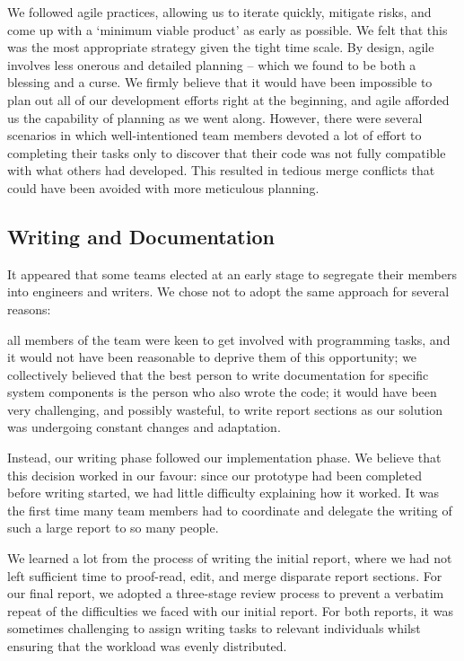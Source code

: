We followed agile practices, allowing us to iterate quickly, mitigate risks, and come up with a `minimum viable product’ as early as possible. We felt that this was the most appropriate strategy given the tight time scale. By design, agile involves less onerous and detailed planning -- which we found to be both a blessing and a curse. We firmly believe that it would have been impossible to plan out all of our development efforts right at the beginning, and agile afforded us the capability of planning as we went along. However, there were several scenarios in which well-intentioned team members devoted a lot of effort to completing their tasks only to discover that their code was not fully compatible with what others had developed. This resulted in tedious merge conflicts that could have been avoided with more meticulous planning.

\subsection{Writing and Documentation}
It appeared that some teams elected at an early stage to segregate their members into engineers and writers. We chose not to adopt the same approach for several reasons:

all members of the team were keen to get involved with programming tasks, and it would not have been reasonable to deprive them of this opportunity;
we collectively believed that the best person to write documentation for specific system components is the person who also wrote the code;
it would have been very challenging, and possibly wasteful, to write report sections as our solution was undergoing constant changes and adaptation.

Instead, our writing phase followed our implementation phase. We believe that this decision worked in our favour: since our prototype had been completed before writing started, we had little difficulty explaining how it worked. It was the first time many team members had to coordinate and delegate the writing of such a large report to so many people. 

We learned a lot from the process of writing the initial report, where we had not left sufficient time to proof-read, edit, and merge disparate report sections. For our final report, we adopted a three-stage review process to prevent a verbatim repeat of the difficulties we faced with our initial report. For both reports, it was sometimes challenging to assign writing tasks to relevant individuals whilst ensuring that the workload was evenly distributed.

